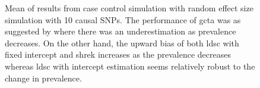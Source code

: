 \begin{figure}
{				
				\label{fig:ldscInCC10RandMean}
			}
			\caption[Mean of Case Control Simulation Results (10 Causal)]
			{Mean of results from case control simulation with random effect size simulation with 10 causal \glspl{SNP}.
				The performance of \gls{gcta} was as suggested by \citet{Golan2014} where there was an underestimation as prevalence decreases.
				On the other hand, the upward bias of both \gls{ldsc} with fixed intercept and \gls{shrek} increases as the prevalence decreases whereas \gls{ldsc} with intercept estimation seems relatively robust to the change in prevalence.
				} 
			\label{fig:CC10RandMean}
		\end{figure}
		
